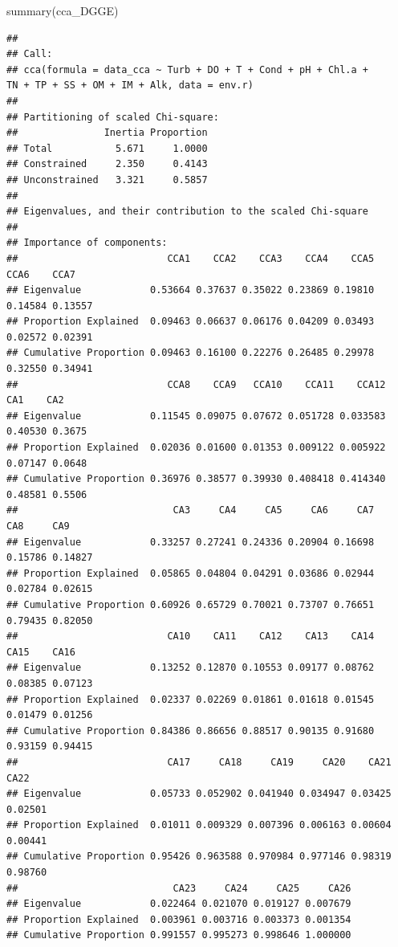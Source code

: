 \documentclass[
]{book}
\newenvironment{Shaded}{\begin{snugshade}}{\end{snugshade}}
\newcommand{\FunctionTok}[1]{\textcolor[rgb]{0.00,0.00,0.00}{#1}}
\newcommand{\NormalTok}[1]{#1}
\begin{document}
\begin{Shaded}
\begin{Highlighting}[]
\FunctionTok{summary}\NormalTok{(cca\_DGGE)}
\end{Highlighting}
\end{Shaded}

\begin{verbatim}
## 
## Call:
## cca(formula = data_cca ~ Turb + DO + T + Cond + pH + Chl.a +      TN + TP + SS + OM + IM + Alk, data = env.r) 
## 
## Partitioning of scaled Chi-square:
##               Inertia Proportion
## Total           5.671     1.0000
## Constrained     2.350     0.4143
## Unconstrained   3.321     0.5857
## 
## Eigenvalues, and their contribution to the scaled Chi-square 
## 
## Importance of components:
##                          CCA1    CCA2    CCA3    CCA4    CCA5    CCA6    CCA7
## Eigenvalue            0.53664 0.37637 0.35022 0.23869 0.19810 0.14584 0.13557
## Proportion Explained  0.09463 0.06637 0.06176 0.04209 0.03493 0.02572 0.02391
## Cumulative Proportion 0.09463 0.16100 0.22276 0.26485 0.29978 0.32550 0.34941
##                          CCA8    CCA9   CCA10    CCA11    CCA12     CA1    CA2
## Eigenvalue            0.11545 0.09075 0.07672 0.051728 0.033583 0.40530 0.3675
## Proportion Explained  0.02036 0.01600 0.01353 0.009122 0.005922 0.07147 0.0648
## Cumulative Proportion 0.36976 0.38577 0.39930 0.408418 0.414340 0.48581 0.5506
##                           CA3     CA4     CA5     CA6     CA7     CA8     CA9
## Eigenvalue            0.33257 0.27241 0.24336 0.20904 0.16698 0.15786 0.14827
## Proportion Explained  0.05865 0.04804 0.04291 0.03686 0.02944 0.02784 0.02615
## Cumulative Proportion 0.60926 0.65729 0.70021 0.73707 0.76651 0.79435 0.82050
##                          CA10    CA11    CA12    CA13    CA14    CA15    CA16
## Eigenvalue            0.13252 0.12870 0.10553 0.09177 0.08762 0.08385 0.07123
## Proportion Explained  0.02337 0.02269 0.01861 0.01618 0.01545 0.01479 0.01256
## Cumulative Proportion 0.84386 0.86656 0.88517 0.90135 0.91680 0.93159 0.94415
##                          CA17     CA18     CA19     CA20    CA21    CA22
## Eigenvalue            0.05733 0.052902 0.041940 0.034947 0.03425 0.02501
## Proportion Explained  0.01011 0.009329 0.007396 0.006163 0.00604 0.00441
## Cumulative Proportion 0.95426 0.963588 0.970984 0.977146 0.98319 0.98760
##                           CA23     CA24     CA25     CA26
## Eigenvalue            0.022464 0.021070 0.019127 0.007679
## Proportion Explained  0.003961 0.003716 0.003373 0.001354
## Cumulative Proportion 0.991557 0.995273 0.998646 1.000000

\end{verbatim}
\end{document}
